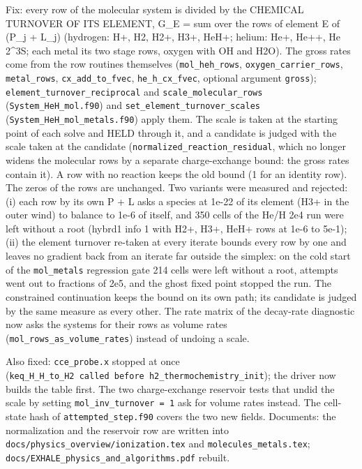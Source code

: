 \documentclass[english,a4paper]{my_memo}
\begin{document}
Fix: every row of the molecular system is divided by the CHEMICAL TURNOVER
OF ITS ELEMENT, G\_E = sum over the rows of element E of (P\_j + L\_j)
(hydrogen: H+, H2, H2+, H3+, HeH+; helium: He+, He++, He 2\^{}3S; each metal its
two stage rows, oxygen with OH and H2O). The gross rates come from the row
routines themselves (\texttt{mol\_heh\_rows}, \texttt{oxygen\_carrier\_rows}, \texttt{metal\_rows},
\texttt{cx\_add\_to\_fvec}, \texttt{he\_h\_cx\_fvec}, optional argument \texttt{gross});
\texttt{element\_turnover\_reciprocal} and \texttt{scale\_molecular\_rows} (\texttt{System\_HeH\_mol.f90})
and \texttt{set\_element\_turnover\_scales} (\texttt{System\_HeH\_mol\_metals.f90}) apply them.
The scale is taken at the starting point of each solve and HELD through it,
and a candidate is judged with the scale taken at the candidate
(\texttt{normalized\_reaction\_residual}, which no longer widens the molecular rows
by a separate charge-exchange bound: the gross rates contain it). A row with
no reaction keeps the old bound (1 for an identity row). The zeros of the
rows are unchanged. Two variants were measured and rejected: (i) each row by
its own P + L asks a species at 1e-22 of its element (H3+ in the outer wind)
to balance to 1e-6 of itself, and 350 cells of the He/H 2e4 run were left
without a root (hybrd1 info 1 with H2+, H3+, HeH+ rows at 1e-6 to 5e-1);
(ii) the element turnover re-taken at every iterate bounds every row by one
and leaves no gradient back from an iterate far outside the simplex: on the
cold start of the \texttt{mol\_metals} regression gate 214 cells were left without a
root, attempts went out to fractions of 2e5, and the ghost fixed point
stopped the run. The constrained continuation keeps the bound on its own
path; its candidate is judged by the same measure as every other. The rate
matrix of the decay-rate diagnostic now asks the systems for their rows as
volume rates (\texttt{mol\_rows\_as\_volume\_rates}) instead of undoing a scale.

Also fixed: \texttt{cce\_probe.x} stopped at once (\texttt{keq\_H\_H\_to\_H2\ called\ before\ h2\_thermochemistry\_init}); the driver now builds the table first. The two
charge-exchange reservoir tests that undid the scale by setting
\texttt{mol\_inv\_turnover\ =\ 1} ask for volume rates instead. The cell-state hash of
\texttt{attempted\_step.f90} covers the two new fields. Documents: the normalization
and the reservoir row are written into \texttt{docs/physics\_overview/ionization.tex}
and \texttt{molecules\_metals.tex}; \texttt{docs/EXHALE\_physics\_and\_algorithms.pdf} rebuilt.
\end{document}
